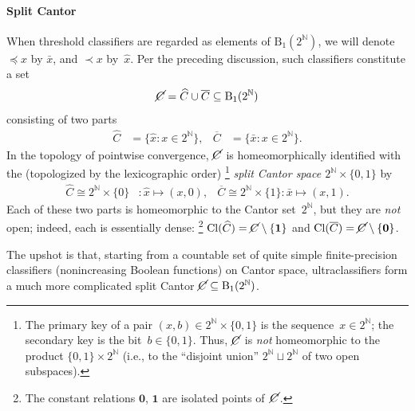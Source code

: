\paragraph{Split Cantor}
When threshold classifiers are regarded as elements of $\mathrm{B}_1(2^{\mathbb{N}})$, we will denote ${\preceq}x$ by $\bar{x}$, and ${\prec}x$ by~$\hat{x}$.
Per the preceding discussion, such classifiers constitute a set
\begin{equation*}
    \cancel{C} = \widehat{C} \cup \overline{C} \subseteq \mathrm{B}_1(2^{\mathbb{N}})
\end{equation*}
consisting of two parts
\begin{align*}
    \widehat{C} &= \{\hat{x}: x\in 2^{\mathbb{N}}\},&
    \overline{C} &= \{\bar{x}: x\in 2^{\mathbb{N}}\}.
\end{align*}
In the topology of pointwise convergence, $\cancel{C}$ is homeomorphically identified with the (topologized by the lexicographic order) \footnote{The primary key of a pair $(x,b)\in2^{\mathbb{N}}\times\{0,1\}$ is the sequence~$x\in 2^{\mathbb{N}}$; the secondary key is the bit~$b\in\{0,1\}$. Thus, $\cancel{C}$ is \emph{not} homeomorphic to the product $\{0,1\}\times 2^{\mathbb{N}}$ (i.e., to the “disjoint union” $2^{\mathbb{N}}\sqcup 2^{\mathbb{N}}$ of two open subspaces).}
\emph{split Cantor space $2^{\mathbb{N}}\times\{0,1\}$} by
\begin{align*}
    \widehat{C}\cong 2^{\mathbb{N}}\times\{0\}&: \hat{x}\mapsto (x,0), &
    \overline{C} \cong 2^{\mathbb{N}}\times\{1\}: \bar{x}\mapsto(x,1).
\end{align*}
Each of these two parts is homeomorphic to the Cantor set~$2^{\mathbb{N}}$, but they are \emph{not} open;
indeed, each is essentially dense:%
\footnote{The constant relations $\mathbf{0}$, $\mathbf{1}$ are isolated points of~$\cancel{C}$.}
$\mathrm{Cl}(\widehat{C}) = \cancel{C}\setminus\{\mathbf{1}\}$ and $\mathrm{Cl}(\overline{C}) = \cancel{C}\setminus\{\mathbf{0}\}$.

The upshot is that, starting from a countable set of quite simple finite-precision classifiers (nonincreasing Boolean functions) on Cantor space, ultraclassifiers form a much more complicated split Cantor $\cancel{C}\subseteq \mathrm{B}_1(2^{\mathbb{N}})$.

